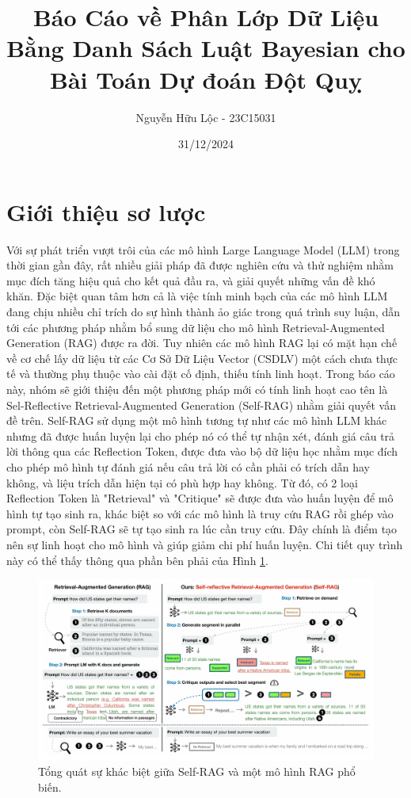 \documentclass{article}
\title{Báo Cáo về Phân Lớp Dữ Liệu Bằng Danh Sách Luật Bayesian cho Bài Toán Dự đoán Đột Quỵ}
\author{Nguyễn Hữu Lộc - 23C15031}
\date{31/12/2024}
\begin{document}
\maketitle

\tableofcontents


\section{Giới thiệu sơ lược}
Với sự phát triển vượt trôi của các mô hình Large Language Model (LLM) trong thời gian gần đây, rất nhiều giải pháp đã được nghiên cứu và thử nghiệm nhằm mục đích tăng hiệu quả cho kết quả đầu ra, và giải quyết những vấn đề khó khăn. Đặc biệt quan tâm hơn cả là việc tính minh bạch của các mô hình LLM đang chịu nhiều chỉ trích do sự hình thành ảo giác trong quá trình suy luận, dẫn tới các phương pháp nhằm bổ sung dữ liệu cho mô hình Retrieval-Augmented Generation (RAG) được ra đời. Tuy nhiên các mô hình RAG lại có mặt hạn chế về cơ chế lấy dữ liệu từ các Cơ Sở Dữ Liệu Vector (CSDLV) một cách chưa thực tế và thường phụ thuộc vào cài đặt cố định, thiếu tính linh hoạt. Trong báo cáo này, nhóm sẽ giới thiệu đến một phương pháp mới có tính linh hoạt cao tên là Sel-Reflective Retrieval-Augmented Generation (Self-RAG) nhằm giải quyết vấn đề trên. Self-RAG sử dụng một mô hình tương tự như các mô hình LLM khác nhưng đã được huấn luyện lại cho phép nó có thể tự nhận xét, đánh giá câu trả lời thông qua các Reflection Token, được đưa vào bộ dữ liệu học nhằm mục đích cho phép mô hình tự đánh giá nếu câu trả lời có cần phải có trích dẫn hay không, và liệu trích dẫn hiện tại có phù hợp hay không. Từ đó, có 2 loại Reflection Token là "Retrieval" và "Critique" sẽ được đưa vào huấn luyện để mô hình tự tạo sinh ra, khác biệt so với các mô hình là truy cứu RAG rồi ghép vào prompt, còn Self-RAG sẽ tự tạo sinh ra lúc cần truy cứu. Đây chính là điểm tạo nên sự linh hoạt cho mô hình và giúp giảm chi phí huấn luyện. Chi tiết quy trình này có thể thấy thông qua phần bên phải của Hình \ref{fig:overview_self_rag}.

\begin{figure} 
    \centering
    \includegraphics[scale = 0.2]{overview_self_rag.jpeg}
    \caption{Tổng quát sự khác biệt giữa Self-RAG và một mô hình RAG phổ biến.}
    \label{fig:overview_self_rag}
\end{figure}
\end{document}
